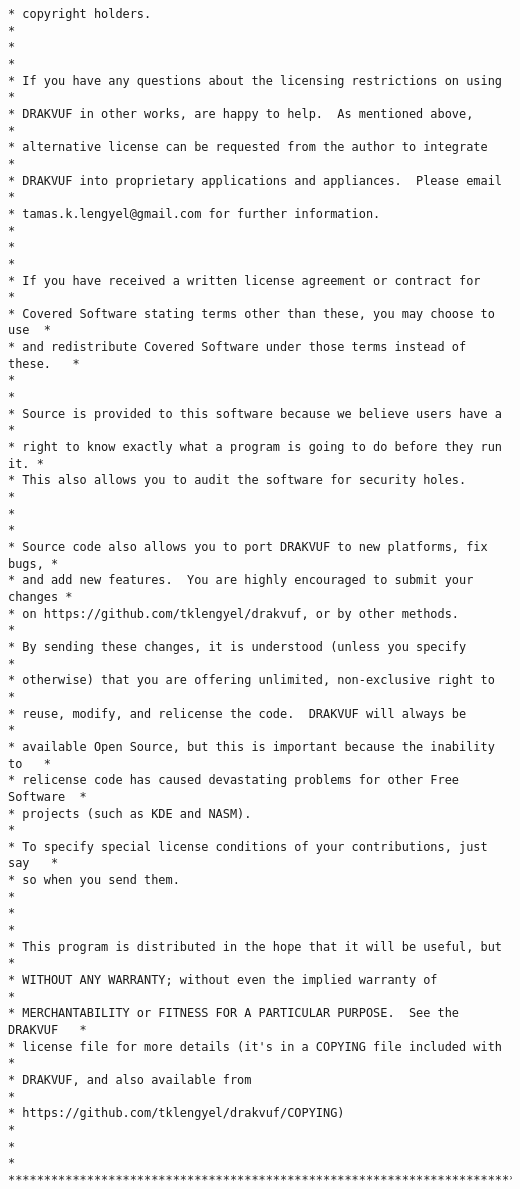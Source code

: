 {\begin{lstlisting}[style=CStyle]
* copyright holders.                                                      *
*                                                                         *
* If you have any questions about the licensing restrictions on using     *
* DRAKVUF in other works, are happy to help.  As mentioned above,         *
* alternative license can be requested from the author to integrate       *
* DRAKVUF into proprietary applications and appliances.  Please email     *
* tamas.k.lengyel@gmail.com for further information.                      *
*                                                                         *
* If you have received a written license agreement or contract for        *
* Covered Software stating terms other than these, you may choose to use  *
* and redistribute Covered Software under those terms instead of these.   *
*                                                                         *
* Source is provided to this software because we believe users have a     *
* right to know exactly what a program is going to do before they run it. *
* This also allows you to audit the software for security holes.          *
*                                                                         *
* Source code also allows you to port DRAKVUF to new platforms, fix bugs, *
* and add new features.  You are highly encouraged to submit your changes *
* on https://github.com/tklengyel/drakvuf, or by other methods.           *
* By sending these changes, it is understood (unless you specify          *
* otherwise) that you are offering unlimited, non-exclusive right to      *
* reuse, modify, and relicense the code.  DRAKVUF will always be          *
* available Open Source, but this is important because the inability to   *
* relicense code has caused devastating problems for other Free Software  *
* projects (such as KDE and NASM).                                        *
* To specify special license conditions of your contributions, just say   *
* so when you send them.                                                  *
*                                                                         *
* This program is distributed in the hope that it will be useful, but     *
* WITHOUT ANY WARRANTY; without even the implied warranty of              *
* MERCHANTABILITY or FITNESS FOR A PARTICULAR PURPOSE.  See the DRAKVUF   *
* license file for more details (it's in a COPYING file included with     *
* DRAKVUF, and also available from                                        *
* https://github.com/tklengyel/drakvuf/COPYING)                           *
*                                                                         *
***************************************************************************/


\end{lstlisting}}
